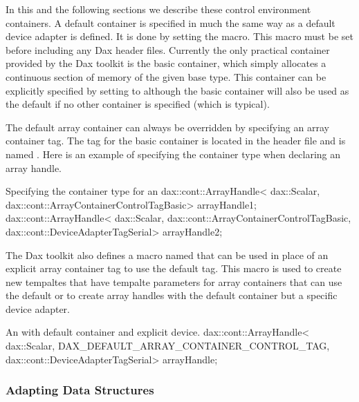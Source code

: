 In this and the following sections we describe these control environment
containers. A default container is specified in much the same way as a
default device adapter is defined. It is done by setting the
 macro. This macro must be set
before including any Dax header files. Currently the only practical
container provided by the Dax toolkit is the basic container, which simply
allocates a continuous section of memory of the given base type. This
container can be explicitly specified by setting
 to
 although the basic
container will also be used as the default if no other container is
specified (which is typical).

The default array container can always be overridden by specifying an array
container tag. The tag for the basic container is located in the
 header file and is named
. Here is an example of specifying
the container type when declaring an array handle.

\begin{daxexample}{Specifying the container type for an }
dax::cont::ArrayHandle<
  dax::Scalar,
  dax::cont::ArrayContainerControlTagBasic> arrayHandle1;
dax::cont::ArrayHandle<
  dax::Scalar,
  dax::cont::ArrayContainerControlTagBasic,
  dax::cont::DeviceAdapterTagSerial> arrayHandle2;
\end{daxexample}

The Dax toolkit also defines a macro named
 that can be used in
place of an explicit array container tag to use the default tag. This macro
is used to create new tempaltes that have tempalte parameters for array
containers that can use the default or to create array handles with the
default container but a specific device adapter.

\begin{daxexample}{An  with default container and explicit device.}
dax::cont::ArrayHandle<
  dax::Scalar,
  DAX_DEFAULT_ARRAY_CONTAINER_CONTROL_TAG,
  dax::cont::DeviceAdapterTagSerial> arrayHandle;
\end{daxexample}


\subsubsection{Adapting Data Structures}

